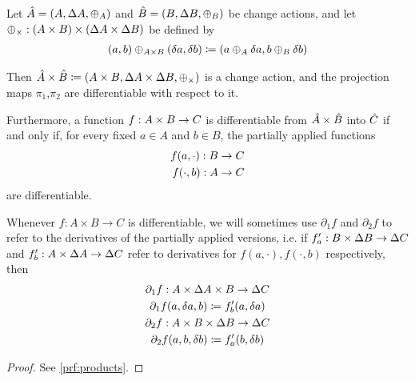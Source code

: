 \begin{prop}[name=Products, restate=products]
  \label{prop:products}
  Let $\hat{A} = (A,\Delta A,\oplus_A)$ and $\hat{B} =
  (B,\Delta B,\oplus_B)$ be change actions,
  and let $\oplus_{\times} : (A \times B) \times (\Delta A \times \Delta B)$ be defined by
  \begin{align*}
    (a, b) \oplus_{A \times B} (\delta a, \delta b) \coloneqq (a \oplus_A \delta a, b \oplus_B \delta b)
  \end{align*}

  Then $\hat{A} \times \hat{B} \coloneqq (A \times B,\Delta A \times
  \Delta B,\oplus_{\times})$ is a change action, and the projection maps $\pi_1$,$\pi_2$
  are differentiable with respect to it.

  Furthermore, a function 
  $f : A \times B \rightarrow C$ is differentiable from $\hat{A} \times \hat{B}$ into $\hat{C}$ if
  and only if, for every fixed $a \in A$ and $b \in B$, the partially applied functions 
  \begin{align*}
    f(a, \cdot) : B \rightarrow C\\
    f(\cdot, b) : A \rightarrow C
  \end{align*}
  are differentiable.
\end{prop}

Whenever $f : A \times B \rightarrow C$ is differentiable, we will sometimes use $\partial_1 f$ and
$\partial_2 f$ to refer to the derivatives of the partially applied versions, i.e. if
$f'_a : B \times \Delta B \rightarrow \Delta C$ and
$f'_b : A \times \Delta A \rightarrow \Delta C$ refer to derivatives for 
$f(a, \cdot), f(\cdot, b)$ respectively, then
\begin{gather*}
  \partial_1 f : A \times \Delta A \times B \rightarrow \Delta C\\
  \partial_1 f(a, \delta a, b) \coloneqq f'_b(a, \delta a)\\
  \partial_2 f : A \times B \times \Delta B \rightarrow \Delta C\\
  \partial_2 f(a, b, \delta b) \coloneqq f'_a(b, \delta b)
\end{gather*}

\ifproofs
\begin{proof}
  See \cref{prf:products}.
\end{proof}
\fi

